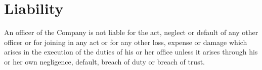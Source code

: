 \section{Liability}

An officer of the Company is not liable for the act, neglect or default of any other officer or for joining in any act or for any other loss, expense or damage which arises in the execution of the duties of his or her office unless it arises through his or her own negligence, default, breach of duty or breach of trust. 